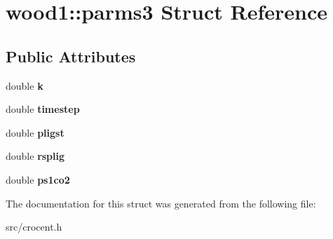 \hypertarget{structwood1_1_1parms3}{\section{wood1\-:\-:parms3 Struct Reference}
\label{structwood1_1_1parms3}
}
\subsection*{Public Attributes}
\begin{DoxyCompactItemize}
\item 
\hypertarget{structwood1_1_1parms3_a60dca2dd6a66d524d6d04cb13f74ca86}{double {\bfseries k}}\label{structwood1_1_1parms3_a60dca2dd6a66d524d6d04cb13f74ca86}

\item 
\hypertarget{structwood1_1_1parms3_a90343efcef053b64566e0fc9b358a99e}{double {\bfseries timestep}}\label{structwood1_1_1parms3_a90343efcef053b64566e0fc9b358a99e}

\item 
\hypertarget{structwood1_1_1parms3_afa9242b771ad6b1ec791ace8832abd97}{double {\bfseries pligst}}\label{structwood1_1_1parms3_afa9242b771ad6b1ec791ace8832abd97}

\item 
\hypertarget{structwood1_1_1parms3_a0ee5dc4b7a79ad3f74b2749b32e7ecb1}{double {\bfseries rsplig}}\label{structwood1_1_1parms3_a0ee5dc4b7a79ad3f74b2749b32e7ecb1}

\item 
\hypertarget{structwood1_1_1parms3_a5f0417a895f409ff4d45028ed3f6536b}{double {\bfseries ps1co2}}\label{structwood1_1_1parms3_a5f0417a895f409ff4d45028ed3f6536b}

\end{DoxyCompactItemize}


The documentation for this struct was generated from the following file\-:\begin{DoxyCompactItemize}
\item 
src/crocent.\-h\end{DoxyCompactItemize}
